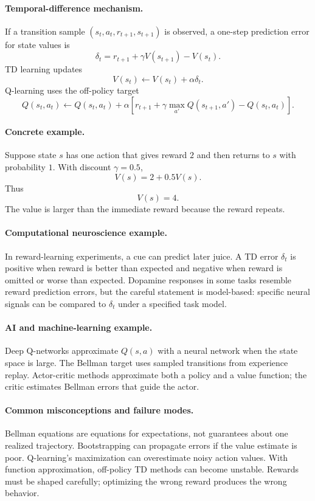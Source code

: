 \paragraph{Temporal-difference mechanism.}
If a transition sample \((s_t,a_t,r_{t+1},s_{t+1})\) is observed, a one-step prediction error for state values is
\[
\boxed{
\delta_t=r_{t+1}+\gamma V(s_{t+1})-V(s_t).
}
\]
TD learning updates
\[
V(s_t)\leftarrow V(s_t)+\alpha \delta_t.
\]
Q-learning uses the off-policy target
\[
Q(s_t,a_t)\leftarrow Q(s_t,a_t)+\alpha
\left[r_{t+1}+\gamma\max_{a'}Q(s_{t+1},a')-Q(s_t,a_t)\right].
\]

\paragraph{Concrete example.}
Suppose state \(s\) has one action that gives reward \(2\) and then returns to \(s\) with probability \(1\). With discount \(\gamma=0.5\),
\[
V(s)=2+0.5V(s).
\]
Thus
\[
V(s)=4.
\]
The value is larger than the immediate reward because the reward repeats.

\paragraph{Computational neuroscience example.}
In reward-learning experiments, a cue can predict later juice. A TD error \(\delta_t\) is positive when reward is better than expected and negative when reward is omitted or worse than expected. Dopamine responses in some tasks resemble reward prediction errors, but the careful statement is model-based: specific neural signals can be compared to \(\delta_t\) under a specified task model.

\paragraph{AI and machine-learning example.}
Deep Q-networks approximate \(Q(s,a)\) with a neural network when the state space is large. The Bellman target uses sampled transitions from experience replay. Actor-critic methods approximate both a policy and a value function; the critic estimates Bellman errors that guide the actor.

\paragraph{Common misconceptions and failure modes.}
Bellman equations are equations for expectations, not guarantees about one realized trajectory. Bootstrapping can propagate errors if the value estimate is poor. Q-learning's maximization can overestimate noisy action values. With function approximation, off-policy TD methods can become unstable. Rewards must be shaped carefully; optimizing the wrong reward produces the wrong behavior.

